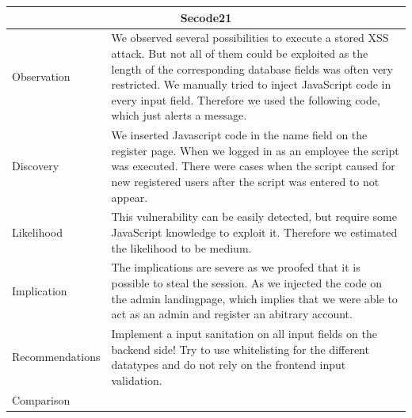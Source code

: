 \documentclass[headsepline,footsepline,footinclude=false,oneside,fontsize=11pt,paper=a4,listof=totoc,bibliography=totoc]{scrbook} %
\begin{document}
\begin{tabular}{ l|p{11cm}  }
	\hline
	\multicolumn{2}{c}{\textbf{Secode21}} \\ 
	\hline
	Observation   &  We observed several possibilities to execute a stored XSS attack. But not all of
	them could be exploited as the length of the corresponding database fields was
	often very restricted.
	We manually tried to inject JavaScript code in every input field. Therefore we
	used the following code, which just alerts a message. \\
	Discovery  & We inserted Javascript code in the name field on the register page.
	When we logged in as an employee the script was executed.  There were cases when the script caused for new registered users after the script was entered to not appear. \\
	Likelihood & This vulnerability can be easily detected, but require some JavaScript knowledge to exploit it. Therefore we estimated the likelihood to be medium. \\
	Implication    & The implications are severe as we proofed that it is possible to steal the session. As we injected the code on the admin landingpage, which implies that we were able to act as an admin and register an abitrary account. \\
	Recommendations & Implement a input sanitation on all input fields on the backend side!  Try to use whitelisting for the different datatypes and do not rely on the frontend input
	validation. \\
	Comparison& \\  
	\hline
\end{tabular}
\end{document}
